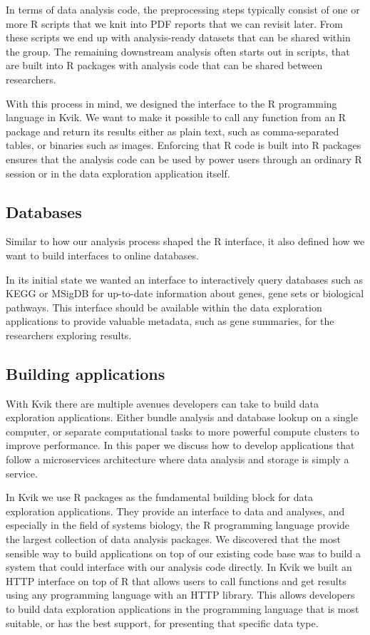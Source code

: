 In terms of data analysis code, the preprocessing steps typically consist of
one or more R scripts that we knit \cite{knitr} into PDF reports that we can
revisit later. From these scripts we end up with analysis-ready datasets that
can be shared within the group. The remaining downstream analysis often starts
out in scripts, that are built into R packages with analysis code that can be
shared between researchers. 

With this process in mind, we designed the interface to the R programming
language in Kvik. We want to make it possible to call any function from an R
package and return its results either as plain text, such as comma-separated
tables, or binaries such as images. Enforcing that R code is built into R
packages ensures that the analysis code can be used by power users through an
ordinary R session or in the data exploration application itself. 


\subsection*{Databases} 
Similar to how our analysis process shaped the R interface, it also defined how
we want to build interfaces to online databases. 

In its initial state we wanted an interface to interactively query databases
such as KEGG or MSigDB for up-to-date information about genes, gene sets or
biological pathways. This interface should be available within the data
exploration applications to provide valuable metadata, such as gene summaries,
for the researchers exploring results.  


\subsection*{Building applications} 
With Kvik there are multiple avenues developers can take to build data
exploration applications. Either bundle analysis and database lookup on a single
computer, or separate computational tasks to more powerful compute clusters to
improve performance. 
In this paper we discuss how to develop applications that follow a
microservices architecture where data analysis and storage is simply a service. 

In Kvik we use R packages as the fundamental building block for data exploration
applications. They provide an interface to data and analyses, and especially in
the field of systems biology, the R programming language provide the largest
collection of data analysis packages. %
We discovered that the most sensible way to build applications on top of our
existing code base was to build a system that could interface with our analysis
code directly. In Kvik we built an HTTP interface on top of R that allows users
to call functions and get results using any programming language with an HTTP
library. This allows developers to build data exploration applications in the
programming language that is most suitable, or has the best support, for
presenting that specific data type. 

